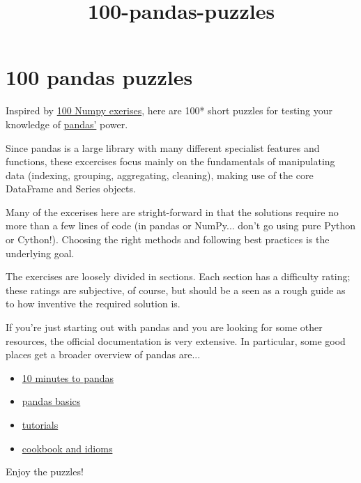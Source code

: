\documentclass[11pt]{article}
\title{100-pandas-puzzles}
\providecommand{\tightlist}{%
      \setlength{\itemsep}{0pt}\setlength{\parskip}{0pt}}
\begin{document}
    
    
    \maketitle
    
    

    
    \section{100 pandas puzzles}\label{pandas-puzzles}

Inspired by \href{https://github.com/rougier/numpy-100}{100 Numpy
exerises}, here are 100* short puzzles for testing your knowledge of
\href{http://pandas.pydata.org/}{pandas'} power.

Since pandas is a large library with many different specialist features
and functions, these excercises focus mainly on the fundamentals of
manipulating data (indexing, grouping, aggregating, cleaning), making
use of the core DataFrame and Series objects.

Many of the excerises here are stright-forward in that the solutions
require no more than a few lines of code (in pandas or NumPy... don't go
using pure Python or Cython!). Choosing the right methods and following
best practices is the underlying goal.

The exercises are loosely divided in sections. Each section has a
difficulty rating; these ratings are subjective, of course, but should
be a seen as a rough guide as to how inventive the required solution is.

If you're just starting out with pandas and you are looking for some
other resources, the official documentation is very extensive. In
particular, some good places get a broader overview of pandas are...

\begin{itemize}
\tightlist
\item
  \href{http://pandas.pydata.org/pandas-docs/stable/10min.html}{10
  minutes to pandas}
\item
  \href{http://pandas.pydata.org/pandas-docs/stable/basics.html}{pandas
  basics}
\item
  \href{http://pandas.pydata.org/pandas-docs/stable/tutorials.html}{tutorials}
\item
  \href{http://pandas.pydata.org/pandas-docs/stable/cookbook.html\#cookbook}{cookbook
  and idioms}
\end{itemize}

Enjoy the puzzles!
\end{document}
